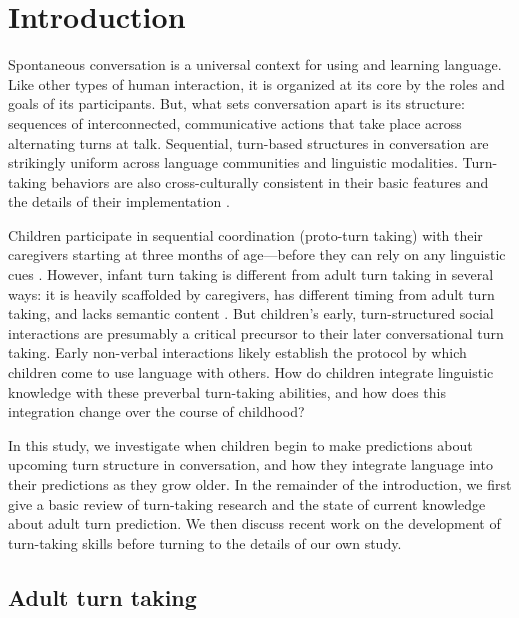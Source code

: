 \documentclass[authoryear, 12pt]{elsarticle}
\begin{document}
\linenumbers

\section*{Introduction}
\label{sec:intro}

Spontaneous conversation is a universal context for using and learning language. Like other types of human interaction, it is organized at its core by the roles and goals of its participants. But, what sets conversation apart is its structure: sequences of interconnected, communicative actions that take place across alternating turns at talk. Sequential, turn-based structures in conversation are strikingly uniform across language communities and linguistic modalities. Turn-taking behaviors are also cross-culturally consistent in their basic features and the details of their implementation \citep{de-vos2015, dingemanse2013, stivers2009}. 

Children participate in sequential coordination (proto-turn taking) with their caregivers starting at three months of age---before they can rely on any linguistic cues \citep[see, among others, ][]{bateson1975, hilbrink2015, jaffe2001, snow1977}. However, infant turn taking is different from adult turn taking in several ways: it is heavily scaffolded by caregivers, has different timing from adult turn taking, and lacks semantic content \citep{hilbrink2015, jaffe2001}. But children's early, turn-structured social interactions are presumably a critical precursor to their later conversational turn taking. Early non-verbal interactions likely establish the protocol by which children come to use language with others. How do children integrate linguistic knowledge with these preverbal turn-taking abilities, and how does this integration change over the course of childhood? 

In this study, we investigate when children begin to make predictions about upcoming turn structure in conversation, and how they integrate language into their predictions as they grow older. In the remainder of the introduction, we first give a basic review of turn-taking research and the state of current knowledge about adult turn prediction. We then discuss recent work on the development of turn-taking skills before turning to the details of our own study.

\subsection*{Adult turn taking}
\end{document}
